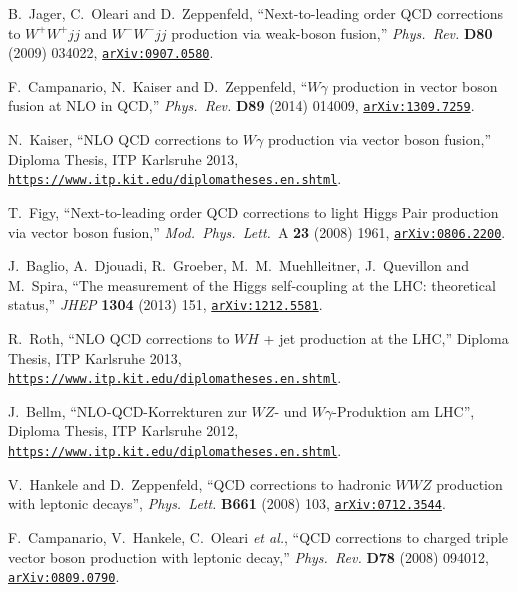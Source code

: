 \documentclass[english,12pt]{article}
\begin{document}
\begin{thebibliography}{10}
  B.~Jager, C.~Oleari and D.~Zeppenfeld,
  ``Next-to-leading order QCD corrections to $W^+ W^+ jj$ and $W^- W^- jj$ production via weak-boson fusion,''
  {\em Phys.\ Rev.} {\bf D80} (2009) 034022,
\href{https://arxiv.org/abs/0907.0580}{{\tt arXiv:0907.0580}}.

  F.~Campanario, N.~Kaiser and D.~Zeppenfeld,
  ``$W \gamma$ production in vector boson fusion at NLO in QCD,''
  {\em Phys.\ Rev.} {\bf D89} (2014) 014009,
\href{https://arxiv.org/abs/1309.7259}{{\tt arXiv:1309.7259}}.

N.~Kaiser, ``NLO QCD corrections to $W\gamma$ production via vector boson fusion,'' 
{Diploma Thesis, ITP Karlsruhe 2013}, 
\href{https://www.itp.kit.edu/diplomatheses.en.shtml}{{\tt https://www.itp.kit.edu/diplomatheses.en.shtml}}.
  
  T.~Figy,
  ``Next-to-leading order QCD corrections to light Higgs Pair production via vector boson fusion,''
  {\em Mod.\ Phys.\ Lett.}\ A {\bf 23} (2008) 1961,
\href{https://www.arXiv.org/abs/0806.2200}{{\tt arXiv:0806.2200}}.

  J.~Baglio, A.~Djouadi, R.~Groeber, M.~M.~Muehlleitner, J.~Quevillon and M.~Spira,
  ``The measurement of the Higgs self-coupling at the LHC: theoretical status,''
  {\em JHEP} {\bf 1304} (2013) 151,
\href{https://www.arXiv.org/abs/1212.5581}{{\tt arXiv:1212.5581}}.

R.~Roth, ``NLO QCD corrections to $WH$ + jet production at the LHC,'' 
{Diploma Thesis, ITP Karlsruhe 2013}, 
\href{https://www.itp.kit.edu/diplomatheses.en.shtml}{{\tt https://www.itp.kit.edu/diplomatheses.en.shtml}}.
  
 J.~Bellm, ``NLO-QCD-Korrekturen zur $WZ$- und $W\gamma$-Produktion am LHC'', {Diploma Thesis, ITP Karlsruhe 2012}, 
\href{https://www.itp.kit.edu/diplomatheses.en.shtml}{{\tt https://www.itp.kit.edu/diplomatheses.en.shtml}}.

V.~Hankele and D.~Zeppenfeld, ``{QCD corrections to hadronic $WWZ$ production
  with leptonic decays}'', {\em Phys.\ Lett.} {\bf B661} (2008) 103,
\href{https://www.arXiv.org/abs/0712.3544}{{\tt arXiv:0712.3544}}.

  F.~Campanario, V.~Hankele, C.~Oleari {\it et al.},
  ``QCD corrections to charged triple vector boson production with leptonic decay,''
  {\em Phys.\ Rev.}  {\bf D78} (2008) 094012,
  \href{https://arxiv.org/abs/0809.0790}{{\tt arXiv:0809.0790}}.


\end{thebibliography}
\end{document}
